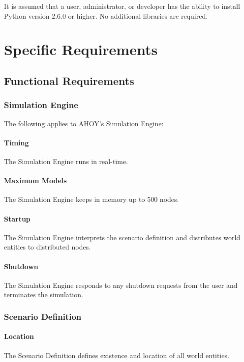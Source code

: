 \documentclass[titlepage]{article}
\begin{document}
It is assumed that a user, administrator, or developer has the ability to install Python version 2.6.0 or higher.  No additional libraries are required.


\section{Specific Requirements%
  \label{specific-requirements}%
}

\subsection{Functional Requirements%
    \label{functional}%
}

\subsubsection{Simulation Engine}
	The following applies to AHOY's Simulation Engine:
    \checkbox \paragraph{Timing} The Simulation Engine runs in real-time.
    \checkbox \paragraph{Maximum Models} The Simulation Engine keeps in memory up to 500 nodes.
    \checkbox \paragraph{Startup} The Simulation Engine interprets the scenario definition and distributes world entities to distributed nodes.
    \checkbox \paragraph{Shutdown} The Simulation Engine responds to any shutdown requests from the user and terminates the simulation.

\subsubsection{Scenario Definition}
	\paragraph{Location} The Scenario Definition defines existence and location of all world entities.
\end{document}
